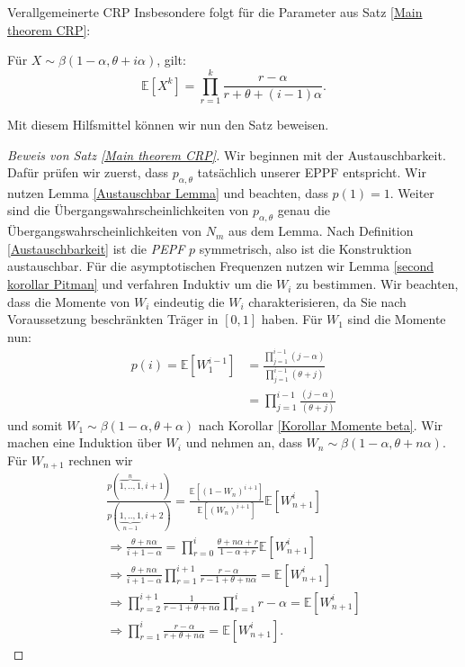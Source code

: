 \begin{section}{Verallgemeinerte CRP}
Insbesondere folgt für die Parameter aus Satz \ref{Main theorem CRP}: 
\begin{Korollar}
    \label{Korollar Momente beta}
    Für $X \sim \beta(1-\alpha,\theta + i\alpha)$, gilt:
    \[
    \mathbb{E}[X^k] = \prod_{r=1}^{k}\frac{r-\alpha}{r+\theta +(i-1)\alpha }.
    \]
\end{Korollar}
Mit diesem Hilfsmittel können wir nun den Satz beweisen.
\begin{proof}[Beweis von Satz \ref{Main theorem CRP}]
   Wir beginnen mit der Austauschbarkeit. Dafür prüfen wir zuerst, dass $p_{\alpha,\theta}$ tatsächlich unserer EPPF entspricht. Wir nutzen Lemma \ref{Austauschbar Lemma} und beachten, dass $p(1) = 1$. Weiter sind die Übergangswahrscheinlichkeiten von $p_{\alpha,\theta}$ genau die Übergangswahrscheinlichkeiten von $N_m$ aus dem Lemma. Nach Definition \ref{Austauschbarkeit} ist die \textit{PEPF} $p$ symmetrisch, also ist die Konstruktion austauschbar. Für die asymptotischen Frequenzen nutzen wir Lemma \ref{second korollar Pitman} und verfahren Induktiv um die $W_i$ zu bestimmen. Wir beachten, dass die Momente von $W_i$ eindeutig die $W_i$ charakterisieren, da Sie nach Voraussetzung beschränkten Träger in $[0,1]$ haben. Für $W_1$ sind die Momente nun:
    \begin{align*}
    p(i)= \mathbb{E}[W_1^{i-1}] &= \frac{\prod_{j=1}^{i-1}(j-\alpha)}{\prod_{j=1}^{i-1}(\theta+j)}\\
    &= \prod_{j=1}^{i-1}\frac{(j-\alpha)}{(\theta+j)}
    \end{align*}
und somit $W_1 \sim \beta(1-\alpha,\theta + \alpha)$ nach Korollar \ref{Korollar Momente beta}. Wir machen eine Induktion über $W_i$ und nehmen an, dass $W_n \sim \beta(1-\alpha,\theta+n\alpha)$. Für $W_{n+1}$ rechnen wir
    \begin{align*}
    \frac{p(\overbrace{1,..,1}^{n},i+1)}{p(\underbrace{1,..,1}_{n-1},i+2)}= \frac{\mathbb{E}[(1-W_n)^{i+1}]}{\mathbb{E}[(W_n)^{i+1}]}\mathbb{E}[W_{n+1}^i] \\
    \Rightarrow \frac{\theta + n\alpha}{i+1-\alpha}=  \prod_{r=0}^{i}\frac{\theta + n\alpha + r}{{1-\alpha + r}}\mathbb{E}[W_{n+1}^i]\\
    \Rightarrow \frac{\theta + n\alpha}{i+1-\alpha}\prod_{r=1}^{i+1}\frac{{r-\alpha }}{ r -1 + \theta + n\alpha }=  \mathbb{E}[W_{n+1}^i]\\
    \Rightarrow \prod_{r=2}^{i+1}\frac{1}{r -1 + \theta + n\alpha}\prod_{r=1}^{i}r-\alpha =  \mathbb{E}[W_{n+1}^i]\\
    \Rightarrow \prod_{r=1}^{i}\frac{r-\alpha}{r+\theta+n\alpha} = \mathbb{E}[W_{n+1}^i].

\end{align*}
\end{proof}
\end{section}

